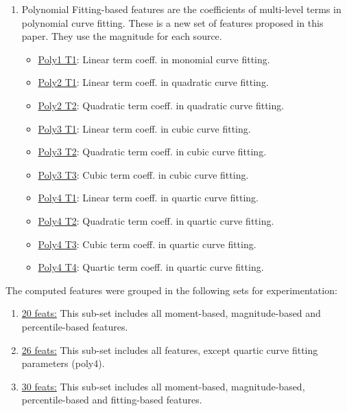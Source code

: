 \documentclass[a4paper,fleqn,usenatbib]{mnras}
\begin{document}
\begin{enumerate}
    \item Polynomial Fitting-based features are the coefficients of multi-level terms in polynomial curve fitting. These is a new set of features proposed in this paper. They use the magnitude for each source.
    \begin{itemize}
        \item \underline{Poly1 T1}: Linear term coeff. in monomial curve fitting.
        \item \underline{Poly2 T1}: Linear term coeff. in quadratic curve fitting.
        \item \underline{Poly2 T2}: Quadratic term coeff. in quadratic curve fitting.
        \item \underline{Poly3 T1}: Linear term coeff. in cubic curve fitting.
        \item \underline{Poly3 T2}: Quadratic term coeff. in cubic curve fitting.
        \item \underline{Poly3 T3}: Cubic term coeff. in cubic curve fitting.
        \item \underline{Poly4 T1}: Linear term coeff. in quartic curve fitting.
        \item \underline{Poly4 T2}: Quadratic term coeff. in quartic curve fitting.
        \item \underline{Poly4 T3}: Cubic term coeff. in quartic curve fitting.
        \item \underline{Poly4 T4}: Quartic term coeff. in quartic curve fitting.
    \end{itemize}

\end{enumerate}

The computed features were grouped in the following sets for experimentation:

\begin{enumerate}
    \item \underline{20 feats:} This sub-set includes all moment-based, magnitude-based and percentile-based features.
    \item \underline{26 feats:} This sub-set includes all features, except quartic curve fitting parameters (poly4).
    \item \underline{30 feats:} This sub-set includes all moment-based, magnitude-based, percentile-based and fitting-based features.
\end{enumerate}
\end{document}
